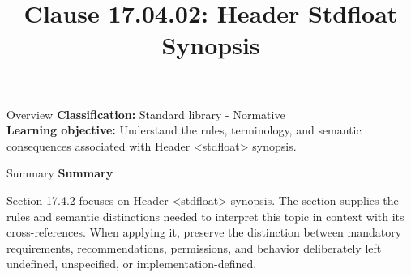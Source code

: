 \documentclass[10pt,letterpaper]{article}
\title{Clause 17.04.02: Header Stdfloat Synopsis}
\author{}
\date{}
\begin{document}
\maketitle
\begin{CornellOverviewBox}{Overview}
\textbf{Classification:} Standard library - Normative\\[2pt]
\textbf{Learning objective:} Understand the rules, terminology, and semantic consequences associated with Header <stdfloat> synopsis.
\end{CornellOverviewBox}\begin{CornellSummaryBox}{Summary}
{\sffamily\bfseries\color{Accent} Summary}\par\vspace{3pt}Section 17.4.2 focuses on Header <stdfloat> synopsis. The section supplies the rules and semantic distinctions needed to interpret this topic in context with its cross-references. When applying it, preserve the distinction between mandatory requirements, recommendations, permissions, and behavior deliberately left undefined, unspecified, or implementation-defined.
\end{CornellSummaryBox}
\end{document}
